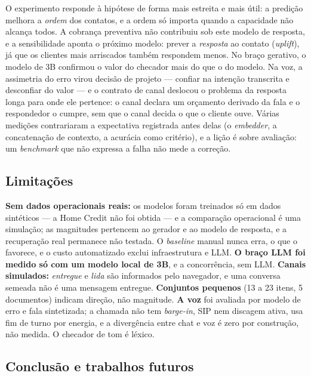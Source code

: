 \documentclass[portuguese]{sbcreviews-2025}%
\begin{document}
O experimento responde à hipótese de forma mais estreita e mais útil: a predição melhora a \textit{ordem} dos contatos, e a ordem só importa quando a capacidade não alcança todos. A cobrança preventiva não contribuiu sob este modelo de resposta, e a sensibilidade aponta o próximo modelo: prever a \textit{resposta} ao contato (\textit{uplift}), já que os clientes mais arriscados também respondem menos. No braço gerativo, o modelo de 3B confirmou o valor do checador mais do que o do modelo. Na voz, a assimetria do erro virou decisão de projeto --- confiar na intenção transcrita e desconfiar do valor --- e o contrato de canal deslocou o problema da resposta longa para onde ele pertence: o canal declara um orçamento derivado da fala e o respondedor o cumpre, sem que o canal decida o que o cliente ouve. Várias medições contrariaram a expectativa registrada antes delas (o \textit{embedder}, a concatenação de contexto, a acurácia como critério), e a lição é sobre avaliação: um \textit{benchmark} que não expressa a falha não mede a correção.

\subsection{Limitações}
\label{sec:limitacoes}

\textbf{Sem dados operacionais reais:} os modelos foram treinados só em dados sintéticos --- a Home Credit não foi obtida --- e a comparação operacional é uma simulação; as magnitudes pertencem ao gerador e ao modelo de resposta, e a recuperação real permanece não testada. O \textit{baseline} manual nunca erra, o que o favorece, e o custo automatizado exclui infraestrutura e LLM. \textbf{O braço LLM foi medido só com um modelo local de 3B}, e a concorrência, sem LLM. \textbf{Canais simulados:} \textit{entregue} e \textit{lida} são informados pelo navegador, e uma conversa semeada não é uma mensagem entregue. \textbf{Conjuntos pequenos} (13 a 23 itens, 5 documentos) indicam direção, não magnitude. \textbf{A voz} foi avaliada por modelo de erro e fala sintetizada; a chamada não tem \textit{barge-in}, SIP nem discagem ativa, usa fim de turno por energia, e a divergência entre chat e voz é zero por construção, não medida. O checador de tom é léxico.

\subsection{Conclusão e trabalhos futuros}
\label{sec:conclusao}
\end{document}
